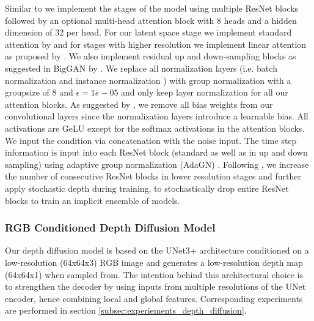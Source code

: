 Similar to \citep{dhariwal_diffusion_2021,nichol_improved_2021} we implement the stages of the model using multiple ResNet blocks followed by an optional multi-head attention block with 8 heads and a hidden dimension of 32 per head. For our latent space stage we implement standard attention by \cite{vaswani_attention_2017} and for stages with higher resolution we implement linear attention as proposed by \cite{wang_linformer_2020}. We also implement residual up and down-sampling blocks as suggested in BigGAN by \cite{brock_large_2019}.
We replace all normalization layers (i.e. batch normalization \cite{ioffe_batch_2015} and instance normalization \citep{ulyanov_instance_2017}) with group normalization \citep{wu_group_2018} with a groupsize of 8 and $\epsilon = 1e-05$ and only keep layer normalization \citep{ba_layer_2016} for all our attention blocks. 
As suggested by \cite{ioffe_batch_2015}, we remove all bias weights from our convolutional layers since the normalization layers introduce a learnable bias.
All activations are GeLU \citep{hendrycks_gaussian_2020} except for the softmax activations in the attention blocks.
We input the condition via concatenation with the noise input.
The time step information is input into each ResNet block (standard as well as in up and down sampling) using adaptive group normalization (AdaGN) \citep{dhariwal_diffusion_2021}.
Following \cite{liu_convnet_2022}, we increase the number of consecutive ResNet blocks in lower resolution stages and further apply stochastic depth \citep{huang_deep_2016} during training, to stochastically drop entire ResNet blocks to train an implicit ensemble of models.

\subsubsection{RGB Conditioned Depth Diffusion Model} \label{subsubsec:rgb_conditioned_depth_diffusion_model}
Our depth diffusion model is based on the UNet3+ architecture conditioned on a low-resolution (64x64x3) RGB image and generates a low-resolution depth map (64x64x1) when sampled from. 
The intention behind this architectural choice is to strengthen the decoder by using inputs from multiple resolutions of the UNet encoder, hence combining local and global features.
Corresponding experiments are performed in section \ref{subsec:experiements_depth_diffusion}.

